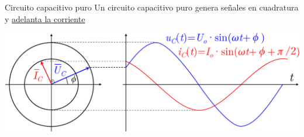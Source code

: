 \documentclass[aspectratio=169, usenames,svgnames,dvipsnames]{beamer}
\begin{document}

\begin{frame}{Circuito capacitivo puro}
    \vspace{2mm}
    Un circuito capacitivo puro genera \alert{señales en cuadratura} y \underline{\alert{adelanta la corriente}}
    
    \begin{center}
            \includegraphics[height=0.37\textheight]{../figs/Fasores_condensador.pdf}
        \end{center} 

    \vspace{-2mm}
    \begin{columns}
    \begin{column}{0.3\columnwidth}


\end{column}
\end{columns}
\end{frame}
\end{document}
